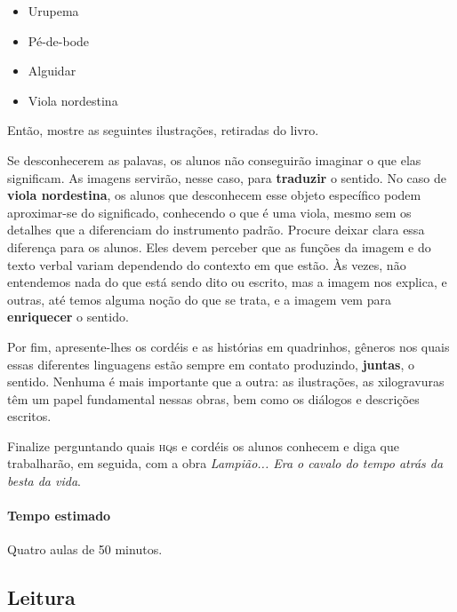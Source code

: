 \documentclass[11pt]{extarticle}
\begin{document}
\begin{itemize}
\item Urupema
\item Pé-de-bode
\item Alguidar
\item Viola nordestina
\end{itemize}

Então, mostre as seguintes ilustrações, retiradas do livro.


Se desconhecerem as palavas, os alunos não conseguirão imaginar o que elas significam. As imagens servirão, nesse caso, para 
\textbf{traduzir} o sentido. No caso de \textbf{viola nordestina}, os alunos 
que desconhecem esse objeto específico podem aproximar-se do significado, conhecendo o que é uma viola, mesmo sem os detalhes que a diferenciam do instrumento padrão. 
Procure deixar clara essa diferença para os alunos. Eles devem perceber que as funções
da imagem e do texto verbal variam dependendo do contexto em que estão. Às vezes, 
não entendemos nada do que está sendo dito ou escrito, mas a imagem nos explica,
e outras, até temos alguma noção do que se trata, e a imagem vem para \textbf{enriquecer}
o sentido. 


Por fim, apresente-lhes os cordéis e as histórias em quadrinhos, gêneros nos quais 
essas diferentes linguagens estão sempre em contato produzindo, \textbf{juntas},
o sentido. Nenhuma é mais importante que a outra: as ilustrações, as xilogravuras
têm um papel fundamental nessas obras, bem como os diálogos e descrições escritos.

Finalize perguntando quais \textsc{hq}s e cordéis os alunos conhecem e diga que trabalharão, em seguida,
com a obra \textit{Lampião... Era o cavalo do tempo atrás da besta da vida}.

\paragraph{Tempo estimado} Quatro aulas de 50 minutos.

\subsection{Leitura}

\end{document}
